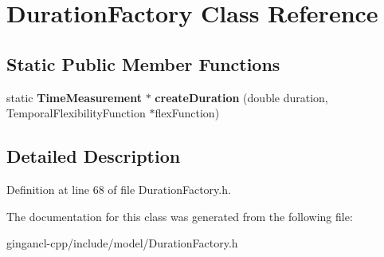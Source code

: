 \section{DurationFactory Class Reference}
\label{classbr_1_1pucrio_1_1telemidia_1_1ginga_1_1ncl_1_1model_1_1time_1_1DurationFactory}
\subsection*{Static Public Member Functions}
\begin{CompactItemize}
\item 
static {\bf TimeMeasurement} $\ast$ \textbf{createDuration} (double duration, TemporalFlexibilityFunction $\ast$flexFunction)\label{classbr_1_1pucrio_1_1telemidia_1_1ginga_1_1ncl_1_1model_1_1time_1_1DurationFactory_af6cad37b5032041b941cbc286c45f6d}

\end{CompactItemize}


\subsection{Detailed Description}




Definition at line 68 of file DurationFactory.h.

The documentation for this class was generated from the following file:\begin{CompactItemize}
\item 
gingancl-cpp/include/model/DurationFactory.h\end{CompactItemize}
